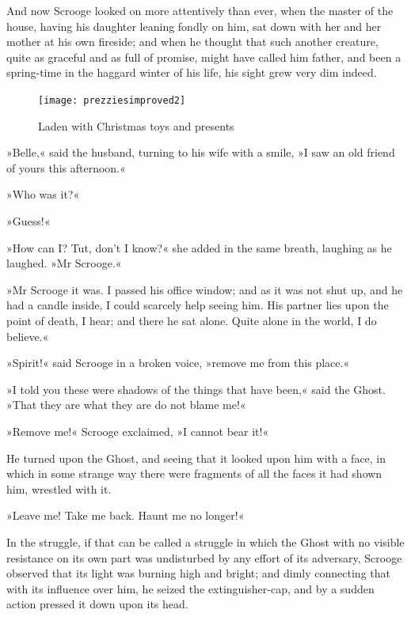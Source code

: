 And now Scrooge looked on more attentively than ever, when the master of the house, having his daughter leaning fondly on him, sat down with her and her mother at his own fireside; and when he thought that such another creature, quite as graceful and as full of promise, might have called him father, and been a spring-time in the haggard winter of his life, his sight grew very dim indeed.

\begin{figure}[p!]
\begin{minipage}[c]{\textwidth}
\texttt{[image: prezziesimproved2]}
\caption[\textbf{Laden with Christmas toys and presents}]{Laden with Christmas toys and presents}
\end{minipage}
\end{figure}

»Belle,« said the husband, turning to his wife with a smile, »I saw an old friend of yours this afternoon.«

»Who was it?«

»Guess!«

»How can I? Tut, don't I know?« she added in the same breath, laughing as he laughed. »Mr Scrooge.«


»Mr Scrooge it was. I passed his office window; and as it was not shut up, and he had a candle inside, I could scarcely help seeing him. His partner lies upon the point of death, I hear; and there he sat alone. Quite alone in the world, I do believe.«

»Spirit!« said Scrooge in a broken voice, »remove me from this place.«

»I told you these were shadows of the things that have been,« said the Ghost. »That they are what they are do not blame me!«

»Remove me!« Scrooge exclaimed, »I cannot bear it!«

He turned upon the Ghost, and seeing that it looked upon him with a face, in which in some strange way there were fragments of all the faces it had shown him, wrestled with it.

»Leave me! Take me back. Haunt me no longer!«

In the struggle, if that can be called a struggle in which the Ghost with no visible resistance on its own part was undisturbed by any effort of its adversary, Scrooge observed that its light was burning high and bright; and dimly connecting that with its influence over him, he seized the extinguisher-cap, and by a sudden action pressed it down upon its head.

